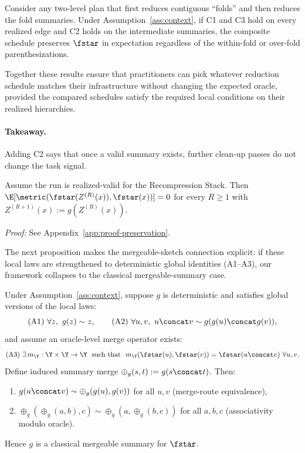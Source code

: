 \begin{corollary}\label{cor:folds}
Consider any two-level plan that first reduces contiguous ``folds'' and then reduces the fold summaries. Under Assumption~\ref{ass:context}, if C1 and C3 hold on every realized edge and C2 holds on the intermediate summaries, the composite schedule preserves $\fstar$ in expectation regardless of the within-fold or over-fold parenthesizations.
\end{corollary}

Together these results ensure that practitioners can pick whatever reduction schedule matches their infrastructure without changing the expected oracle, provided the compared schedules satisfy the required local conditions on their realized hierarchies.

\paragraph{Takeaway.}
Adding C2 says that once a valid summary exists, further clean-up passes do not change the task signal.

\begin{theorem}\label{thm:multi-round}
Assume the run is realized-valid for the Recompression Stack. Then $\E[\metric(\fstar(Z^{(R)}(x)), \fstar(x))] = 0$ for every $R \geq 1$ with $Z^{(R+1)}(x) := g(Z^{(R)}(x))$.
\end{theorem}

\noindent\textit{Proof:} See Appendix~\ref{app:proof-preservation}.

The next proposition makes the mergeable-sketch connection explicit: if these local laws are strengthened to deterministic global identities (A1--A3), our framework collapses to the classical mergeable-summary case.

\begin{proposition}\label{prop:mergeable-reduction}
Under Assumption~\ref{ass:context}, suppose $g$ is deterministic and satisfies global versions of the local laws:
\[
\text{(A1)}\ \forall z,\ g(z) \sim z,\qquad
\text{(A2)}\ \forall u,v,\ u \concat v \sim g(g(u)\concat g(v)),
\]
and assume an oracle-level merge operator exists:
\[
\text{(A3)}\ \exists\, m_{\Y}:\Y\times\Y\to\Y\ \text{ such that }\ m_{\Y}(\fstar(u),\fstar(v))=\fstar(u\concat v)\ \forall u,v.
\]
Define induced summary merge $\oplus_g(s,t):=g(s\concat t)$. Then:
\begin{enumerate}[nosep]
\item $g(u\concat v)\sim \oplus_g(g(u),g(v))$ for all $u,v$ (merge-route equivalence),
\item $\oplus_g(\oplus_g(a,b),c)\sim \oplus_g(a,\oplus_g(b,c))$ for all $a,b,c$ (associativity modulo oracle).
\end{enumerate}
Hence $g$ is a classical mergeable summary for $\fstar$.
\end{proposition}

